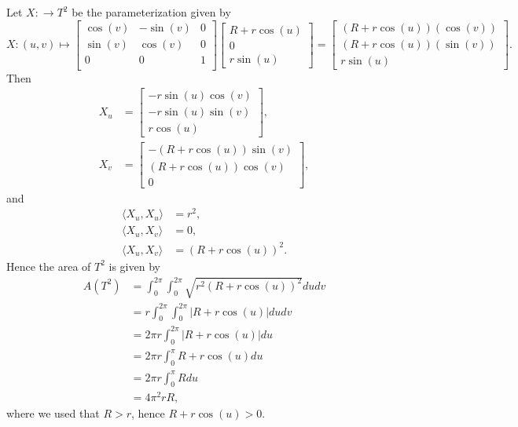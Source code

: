 \documentclass{article}
\theoremstyle{definition}
\begin{document}
Let $X : \to T^2$ be the parameterization given by 
\[
	X
	:
	(u, v)
	\mapsto
	\begin{bmatrix}
		\cos(v) & - \sin(v) & 0 \\
		\sin(v) & \cos(v) & 0 \\
		0 & 0 & 1 \\
	\end{bmatrix}
	\begin{bmatrix}
		R + r \cos(u) \\
		0 \\
		r\sin(u)
	\end{bmatrix}
	=
	\begin{bmatrix}
		\left(R + r \cos(u)\right)(\cos(v)) \\
		\left(R + r \cos(u)\right)(\sin(v)) \\
		r\sin(u)
	\end{bmatrix}.
\] 
Then 
\begin{align*}
	X_u
	&=
	\begin{bmatrix}
		- r \sin(u)\cos(v) \\
		- r \sin(u)\sin(v) \\
		r\cos(u)
	\end{bmatrix}, \\
	X_v
	&=
	\begin{bmatrix}
		-\left(R + r \cos(u)\right)\sin(v) \\
		\left(R + r \cos(u)\right)\cos(v) \\
		0
	\end{bmatrix},
\end{align*}
and
\begin{align*}
	\langle X_u, X_u \rangle
	&=
	r^2, \\
	\langle X_u, X_v \rangle
	&=
	0, \\
	\langle X_u, X_v \rangle
	&=
	\left(R + r \cos(u)\right)^2.
\end{align*}
Hence the area of $T^2$ is given by
\begin{align*}
	A(T^2)
	&=
	\int_{0}^{2\pi}
	\int_{0}^{2\pi}
	\sqrt{
		r^2\left(R + r \cos(u)\right)^2
	}
	dudv \\
	&=
	r
	\int_{0}^{2\pi}
	\int_{0}^{2\pi}
	\left|R + r \cos(u)\right|
	dudv \\
	&=
	2\pi r
	\int_{0}^{2\pi}
	\left|R + r \cos(u)\right|
	du \\
	&=
	2\pi r
	\int_{0}^{\pi}
	R + r \cos(u)
	du \\
	&=
	2\pi r
	\int_{0}^{\pi}
	R
	du \\
	&=
	4\pi^2 rR,
\end{align*}
where we used that $R > r$, hence $R + r\cos(u) > 0$.
\end{document}
